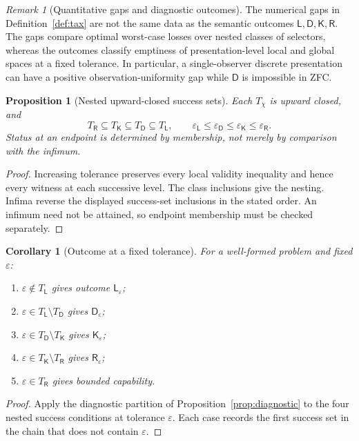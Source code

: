 \documentclass[11pt]{article}
\theoremstyle{plain}
\newtheorem{proposition}[theorem]{Proposition}
\newtheorem{corollary}[theorem]{Corollary}
\theoremstyle{definition}
\theoremstyle{remark}
\newtheorem{remark}[theorem]{Remark}
\newcommand{\eps}{\varepsilon}
\begin{document}
\begin{remark}[Quantitative gaps and diagnostic outcomes]
The numerical gaps in Definition~\ref{def:tax} are not the same data as the
semantic outcomes $\mathsf L,\mathsf D,\mathsf K,\mathsf R$. The gaps compare
optimal worst-case losses over nested classes of selectors, whereas the outcomes
classify emptiness of presentation-level local and global spaces at a fixed
tolerance. In particular, a single-observer discrete presentation can have a
positive observation-uniformity gap while $\mathsf D$ is impossible in ZFC.
\end{remark}

\begin{proposition}[Nested upward-closed success sets]\label{prop:spectrum}
Each $T_\chi$ is upward closed, and
\[
T_{\mathsf R}\subseteq T_{\mathsf K}\subseteq
T_{\mathsf D}\subseteq T_{\mathsf L},
\qquad
\eps_{\mathsf L}\le\eps_{\mathsf D}\le
\eps_{\mathsf K}\le\eps_{\mathsf R}.
\]
Status at an endpoint is determined by membership, not merely by comparison with
the infimum.
\end{proposition}

\begin{proof}
Increasing tolerance preserves every local validity inequality and hence every
witness at each successive level. The class inclusions give the nesting. Infima
reverse the displayed success-set inclusions in the stated order. An infimum
need not be attained, so endpoint membership must be checked separately.
\end{proof}

\begin{corollary}[Outcome at a fixed tolerance]\label{cor:tolerance-outcome}
For a well-formed problem and fixed $\eps$:
\begin{enumerate}[label=(\roman*)]
\item $\eps\notin T_{\mathsf L}$ gives outcome $\mathsf L_\eps$;
\item $\eps\in T_{\mathsf L}\setminus T_{\mathsf D}$ gives $\mathsf D_\eps$;
\item $\eps\in T_{\mathsf D}\setminus T_{\mathsf K}$ gives $\mathsf K_\eps$;
\item $\eps\in T_{\mathsf K}\setminus T_{\mathsf R}$ gives $\mathsf R_\eps$;
\item $\eps\in T_{\mathsf R}$ gives bounded capability.
\end{enumerate}
\end{corollary}

\begin{proof}
Apply the diagnostic partition of Proposition~\ref{prop:diagnostic} to the four
nested success conditions at tolerance $\eps$. Each case records the first
success set in the chain that does not contain $\eps$.
\end{proof}
\end{document}
